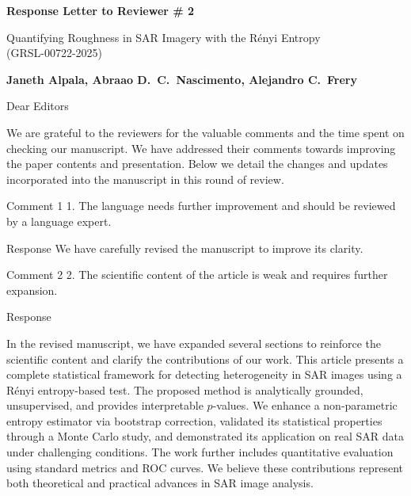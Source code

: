 \documentclass[11pt]{report}
\begin{document}
\begin{center}
\large{\textbf{Response Letter to Reviewer \# 2}}

\vglue 0.3cm

\huge{ Quantifying Roughness in SAR Imagery with the Rényi Entropy\\ (GRSL-00722-2025)}
\end{center}

\begin{center}
\textbf{Janeth Alpala,   Abraao D.\ C.\ Nascimento, Alejandro C.\ Frery }
\end{center}

\date{\today}



\vspace{0.5cm}
\noindent Dear Editors
\bigskip

\noindent We are grateful to the reviewers for the valuable comments and the time spent on checking our manuscript. 
We have addressed their comments towards improving the paper contents and presentation. 
Below we detail the changes and updates incorporated into the manuscript in this round of review.

\medskip


\vspace{2em}
\begin{reviewbox}{Comment 1}
1. The language needs further improvement and should be reviewed by a language expert.
\end{reviewbox}

\begin{responsebox}{Response}
We have carefully revised the manuscript to improve its clarity.

\end{responsebox}

\vspace{3em}
\begin{reviewbox}{Comment 2}
2. The scientific content of the article is weak and requires further expansion.
\end{reviewbox}

\begin{responsebox}{Response}

In the revised manuscript, we have expanded several sections to reinforce the scientific content and clarify the contributions of our work. 
This article presents a complete statistical framework for detecting heterogeneity in SAR images using a Rényi entropy-based test. 
The proposed method is analytically grounded, unsupervised, and provides interpretable $p$-values. 
We enhance a non-parametric entropy estimator via bootstrap correction, validated its statistical properties through a Monte Carlo study, and demonstrated its application on real SAR data under challenging conditions. 
The work further includes quantitative evaluation using standard metrics and ROC curves. We believe these contributions represent both theoretical and practical advances in SAR image analysis.

\end{responsebox}
\end{document}
